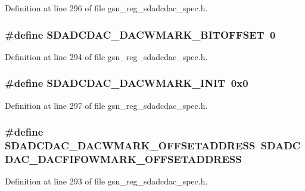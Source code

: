 Definition at line 296 of file gsn\_\-reg\_\-sdadcdac\_\-spec.h.

\hypertarget{a00569_ad41ec5dec5d81ea3753ccec7c5231c27}{
\subsubsection[{SDADCDAC\_\-DACWMARK\_\-BITOFFSET}]{\setlength{\rightskip}{0pt plus 5cm}\#define SDADCDAC\_\-DACWMARK\_\-BITOFFSET~0}}
\label{a00569_ad41ec5dec5d81ea3753ccec7c5231c27}


Definition at line 294 of file gsn\_\-reg\_\-sdadcdac\_\-spec.h.

\hypertarget{a00569_ae2944f70260c8443ac3f2e0115524167}{
\subsubsection[{SDADCDAC\_\-DACWMARK\_\-INIT}]{\setlength{\rightskip}{0pt plus 5cm}\#define SDADCDAC\_\-DACWMARK\_\-INIT~0x0}}
\label{a00569_ae2944f70260c8443ac3f2e0115524167}


Definition at line 297 of file gsn\_\-reg\_\-sdadcdac\_\-spec.h.

\hypertarget{a00569_a0c1c021bbd07dfa175dabb78eb70bf3a}{
\subsubsection[{SDADCDAC\_\-DACWMARK\_\-OFFSETADDRESS}]{\setlength{\rightskip}{0pt plus 5cm}\#define SDADCDAC\_\-DACWMARK\_\-OFFSETADDRESS~SDADCDAC\_\-DACFIFOWMARK\_\-OFFSETADDRESS}}
\label{a00569_a0c1c021bbd07dfa175dabb78eb70bf3a}


Definition at line 293 of file gsn\_\-reg\_\-sdadcdac\_\-spec.h.

